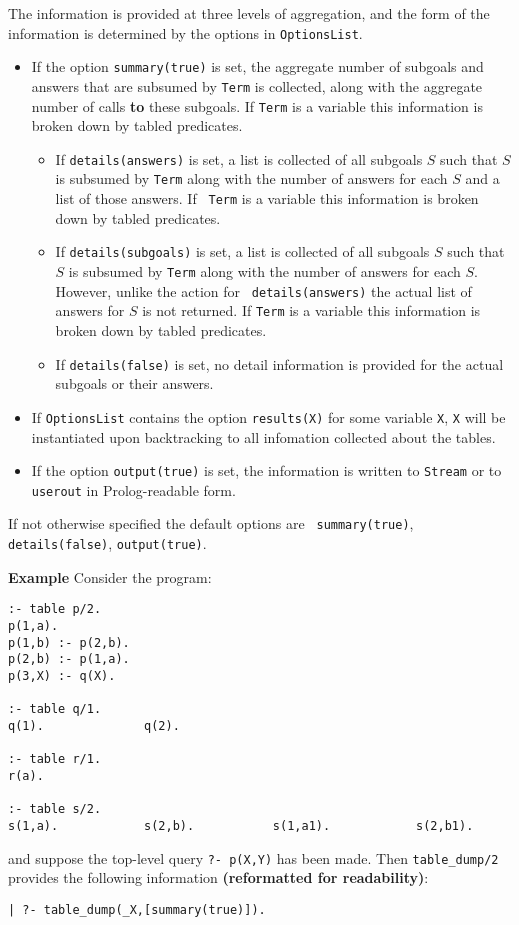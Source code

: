 \begin{description}
The information is provided at three levels of aggregation, and the form
of the information is determined by the options in {\tt OptionsList}.
%
\begin{itemize}
\item If the option {\tt summary(true)} is set, the aggregate number
  of subgoals and answers that are subsumed by {\tt Term} is
  collected, along with the aggregate number of calls {\bf to} these
  subgoals.  If {\tt Term} is a variable this information is broken
  down by tabled predicates.
%
\begin{itemize}
\item If {\tt details(answers)} is set, a list is collected of all
  subgoals $S$ such that $S$ is subsumed by {\tt Term} along with the
  number of answers for each $S$ and a list of those answers.  If {\tt
    Term} is a variable this information is broken down by tabled
  predicates.
%
\item If {\tt details(subgoals)} is set, a list is collected of all
  subgoals $S$ such that $S$ is subsumed by {\tt Term} along with the
  number of answers for each $S$.  However, unlike the action for {\tt
    details(answers)} the actual list of answers for $S$ is not
  returned.  If {\tt Term} is a variable this information is broken
  down by tabled predicates.
%
\item If {\tt details(false)} is set, no detail information is
  provided for the actual subgoals or their answers.
\end{itemize}
%
\item If {\tt OptionsList} contains the option {\tt results(X)} for
  some variable {\tt X}, {\tt X} will be instantiated upon
  backtracking to all infomation collected about the tables.
%
\item If the option {\tt output(true)} is set, the information is
  written to {\tt Stream} or to {\tt userout} in Prolog-readable form.
\end{itemize}
%
If not otherwise specified the default options are {\tt
  summary(true)}, {\tt details(false)}, {\tt output(true)}.

{\bf Example}  Consider the program:
\begin{verbatim}
:- table p/2.
p(1,a).
p(1,b) :- p(2,b).
p(2,b) :- p(1,a).
p(3,X) :- q(X).

:- table q/1.
q(1).              q(2).

:- table r/1.
r(a).

:- table s/2.
s(1,a).            s(2,b).           s(1,a1).            s(2,b1).
\end{verbatim}
and suppose the top-level query {\tt ?- p(X,Y)} has been made.  Then
{\tt table\_dump/2} provides the following information {\bf
 (reformatted for readability)}:
%
{\small
\begin{verbatim}
| ?- table_dump(_X,[summary(true)]).


\end{verbatim}}
\end{description}
